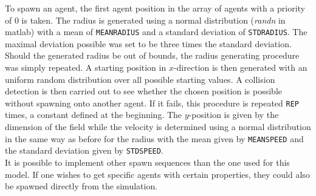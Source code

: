 \noi To spawn an agent, the first agent position in the array of agents with a priority of 0 is taken. The radius is generated using a normal distribution (\textit{randn} in matlab) with a mean of \texttt{MEANRADIUS} and a standard deviation of \texttt{STDRADIUS}. The maximal deviation possible was set to be three times the standard deviation. Should the generated radius be out of bounds, the radius generating procedure was simply repeated. A starting position in $x$-direction is then generated with an uniform random distribution over all possible starting values. A collision detection is then carried out to see whether the chosen position is possible without spawning onto another agent. If it fails, this procedure is repeated \texttt{REP} times, a constant defined at the beginning. The $y$-position is given by the dimension of the field while the velocity is determined using a normal distribution in the same way as before for the radius with the mean given by \texttt{MEANSPEED} and the standard deviation given by \texttt{STDSPEED}.\\
\noi It is possible to implement other spawn sequences than the one used for this model. If one wishes to get specific agents with certain properties, they could also be spawned directly from the simulation.


